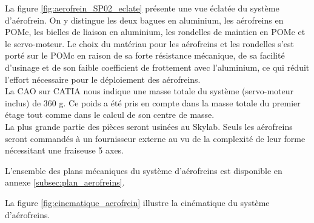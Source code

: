 \begin{minipage}{0.35\textwidth}
    La figure \ref{fig:aerofrein_SP02_eclate} présente une vue éclatée du système d'aérofrein. On y distingue les deux bagues
    en aluminium, les aérofreins en \gls{POMc}, les bielles de liaison en aluminium, les rondelles de maintien en \gls{POMc} et
    le servo-moteur. Le choix du matériau pour les aérofreins et les rondelles s'est porté sur le \gls{POMc} en raison de sa
    forte résistance mécanique, de sa facilité d'usinage et de son faible coefficient de frottement avec l'aluminium, ce qui
    réduit l'effort nécessaire pour le déploiement des aérofreins.\\

    La \acrshort{CAO} sur \acrshort{CATIA} nous indique une masse totale du système (servo-moteur inclus) de 360 g. Ce poids
    a été pris en compte dans la masse totale du premier étage tout comme dans le calcul de son centre de masse.\\
    
    La plus grande partie des pièces seront usinées au \gls{Skylab}. Seuls les aérofreins seront commandés à un fournisseur
    externe au vu de la complexité de leur forme nécessitant une fraiseuse 5 axes.
\end{minipage}

\vspace{1cm}

L'ensemble des plans mécaniques du système d'aérofreins est disponible en annexe \ref{subsec:plan_aerofreins}.

\vfill

\newpage


La figure \ref{fig:cinematique_aerofrein} illustre la cinématique du système d'aérofreins.

\vfill

